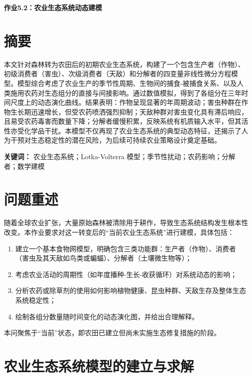 \documentclass[12pt]{article}
\begin{document}
\begin{center}
    \Large \textbf{作业5.2：农业生态系统动态建模}
\end{center}

\section*{摘要}
本文针对森林转为农田后的初期农业生态系统，构建了一个包含生产者（作物）、初级消费者（害虫）、次级消费者（天敌）和分解者的四变量非线性微分方程模型。模型综合考虑了农业生产的季节性周期、生物间的捕食-被捕食关系、以及人类施用农药对生态组分的直接与间接影响。通过数值模拟，得到了各组分在三年时间尺度上的动态演化曲线。结果表明：作物呈现显著的年周期波动；害虫种群在作物生长期迅速增长，但受农药喷洒强烈抑制；天敌种群对害虫变化具有滞后响应，且易受农药毒害而数量下降；分解者缓慢积累，反映系统有机质输入水平，但其活性亦受化学品干扰。本模型不仅再现了农业生态系统的典型动态特征，还揭示了人为干预对生态稳定性的潜在风险，为后续可持续农业策略设计奠定基础。

\textbf{关键词：} 农业生态系统；Lotka-Volterra 模型；季节性扰动；农药影响；分解者；数学建模

\section{问题重述}
随着全球农业扩张，大量原始森林被清除用于耕作，导致生态系统结构发生根本性改变。本作业要求对这一转变后的“当前农业生态系统”进行建模，具体包括：
\begin{enumerate}
    \item 建立一个基本食物网模型，明确包含三类功能群：生产者（作物）、消费者（害虫及其天敌如鸟类或蝙蝠）、分解者（土壤微生物等）；
    \item 考虑农业活动的周期性（如年度播种-生长-收获循环）对系统动态的影响；
    \item 分析农药或除草剂的使用如何影响植物健康、昆虫种群、天敌生存及整体生态系统稳定性；
    \item 绘制各组分数量随时间变化的动态演化图，并给出合理解释。
\end{enumerate}
本问聚焦于“当前”状态，即农田已建立但尚未实施生态修复措施的阶段。

\section{农业生态系统模型的建立与求解}
\end{document}
